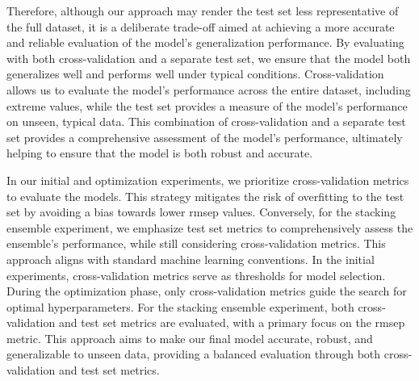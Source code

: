Therefore, although our approach may render the test set less representative of the full dataset, it is a deliberate trade-off aimed at achieving a more accurate and reliable evaluation of the model's generalization performance.
By evaluating with both cross-validation and a separate test set, we ensure that the model both generalizes well and performs well under typical conditions.
Cross-validation allows us to evaluate the model's performance across the entire dataset, including extreme values, while the test set provides a measure of the model's performance on unseen, typical data.
This combination of cross-validation and a separate test set provides a comprehensive assessment of the model's performance, ultimately helping to ensure that the model is both robust and accurate.

In our initial and optimization experiments, we prioritize cross-validation metrics to evaluate the models.
This strategy mitigates the risk of overfitting to the test set by avoiding a bias towards lower \gls{rmsep} values.
Conversely, for the stacking ensemble experiment, we emphasize test set metrics to comprehensively assess the ensemble's performance, while still considering cross-validation metrics.
This approach aligns with standard machine learning conventions.
In the initial experiments, cross-validation metrics serve as thresholds for model selection.
During the optimization phase, only cross-validation metrics guide the search for optimal hyperparameters.
For the stacking ensemble experiment, both cross-validation and test set metrics are evaluated, with a primary focus on the \gls{rmsep} metric.
This approach aims to make our final model accurate, robust, and generalizable to unseen data, providing a balanced evaluation through both cross-validation and test set metrics.
